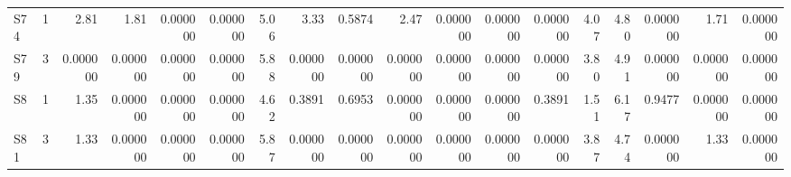 {\begin{longtable}{lrrrrrrrrrrrrrrrrr}
  S74 & 1 & 2.81 & 1.81 & 0.000000 & 0.000000 & 5.06 & 3.33 & 0.5874 & 2.47 & 0.000000 & 0.000000 & 0.000000 & 4.07 & 4.80 & 0.000000 & 1.71 & 0.000000 \\
  S79 & 3 & 0.000000 & 0.000000 & 0.000000 & 0.000000 & 5.88 & 0.000000 & 0.000000 & 0.000000 & 0.000000 & 0.000000 & 0.000000 & 3.80 & 4.91 & 0.000000 & 0.000000 & 0.000000 \\
  S8 & 1 & 1.35 & 0.000000 & 0.000000 & 0.000000 & 4.62 & 0.3891 & 0.6953 & 0.000000 & 0.000000 & 0.000000 & 0.3891 & 1.51 & 6.17 & 0.9477 & 0.000000 & 0.000000 \\
  S81 & 3 & 1.33 & 0.000000 & 0.000000 & 0.000000 & 5.87 & 0.000000 & 0.000000 & 0.000000 & 0.000000 & 0.000000 & 0.000000 & 3.87 & 4.74 & 0.000000 & 1.33 & 0.000000 \\
\end{longtable}
}
